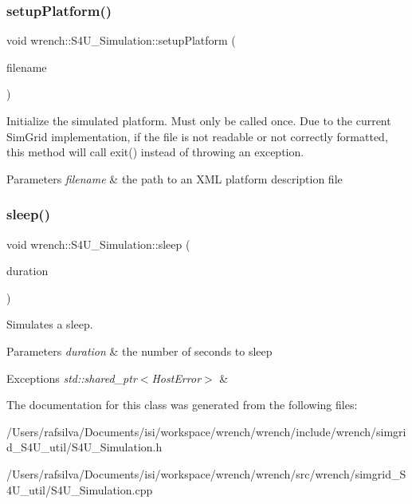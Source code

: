 \subsubsection{\texorpdfstring{setup\+Platform()}{setupPlatform()}}
{\footnotesize\ttfamily void wrench\+::\+S4\+U\+\_\+\+Simulation\+::setup\+Platform (\begin{DoxyParamCaption}\item[{std\+::string \&}]{filename }\end{DoxyParamCaption})}



Initialize the simulated platform. Must only be called once. Due to the current Sim\+Grid implementation, if the file is not readable or not correctly formatted, this method will call exit() instead of throwing an exception. 


\begin{DoxyParams}{Parameters}
{\em filename} & the path to an X\+ML platform description file \\
\hline
\end{DoxyParams}
\mbox{\label{classwrench_1_1_s4_u___simulation_af93ef50da20f860de80212a3cff1cfdb}} 
\subsubsection{\texorpdfstring{sleep()}{sleep()}}
{\footnotesize\ttfamily void wrench\+::\+S4\+U\+\_\+\+Simulation\+::sleep (\begin{DoxyParamCaption}\item[{double}]{duration }\end{DoxyParamCaption})\hspace{0.3cm}{\ttfamily [static]}}



Simulates a sleep. 


\begin{DoxyParams}{Parameters}
{\em duration} & the number of seconds to sleep\\
\hline
\end{DoxyParams}

\begin{DoxyExceptions}{Exceptions}
{\em std\+::shared\+\_\+ptr$<$\+Host\+Error$>$} & \\
\hline
\end{DoxyExceptions}


The documentation for this class was generated from the following files\+:\begin{DoxyCompactItemize}
\item 
/\+Users/rafsilva/\+Documents/isi/workspace/wrench/wrench/include/wrench/simgrid\+\_\+\+S4\+U\+\_\+util/S4\+U\+\_\+\+Simulation.\+h\item 
/\+Users/rafsilva/\+Documents/isi/workspace/wrench/wrench/src/wrench/simgrid\+\_\+\+S4\+U\+\_\+util/S4\+U\+\_\+\+Simulation.\+cpp\end{DoxyCompactItemize}
